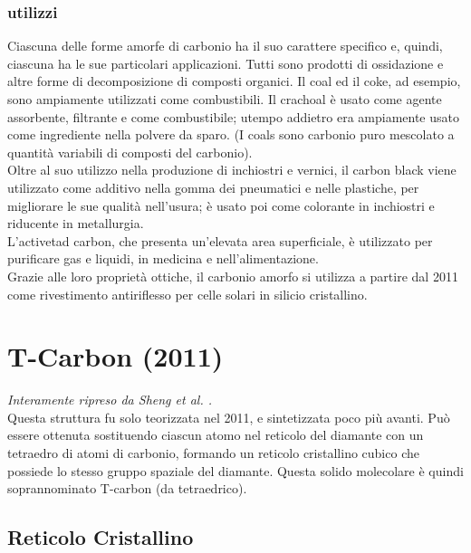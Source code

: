 \documentclass[a4paper,titlepage]{book}
\begin{document}
\subsection{utilizzi}
Ciascuna delle forme amorfe di carbonio ha il suo carattere specifico e, quindi, ciascuna ha le sue particolari applicazioni. Tutti sono prodotti di ossidazione e altre forme di decomposizione di composti organici. Il coal ed il coke, ad esempio, sono ampiamente utilizzati come combustibili. Il crachoal è usato come agente assorbente, filtrante e come combustibile; utempo addietro era ampiamente usato come ingrediente nella polvere da sparo. (I coals sono carbonio puro mescolato a quantità variabili di composti del carbonio). \\
Oltre al suo utilizzo nella produzione di inchiostri e vernici, il carbon black viene utilizzato come additivo nella gomma dei pneumatici e nelle plastiche, per migliorare le sue qualità nell'usura; è usato poi come colorante in inchiostri e riducente in metallurgia. \\
L'activetad carbon, che presenta un’elevata area superficiale, è utilizzato per purificare gas e liquidi, in medicina e nell’alimentazione. \\
Grazie alle loro proprietà ottiche, il carbonio amorfo si utilizza a partire dal 2011 come rivestimento antiriflesso per celle solari in silicio cristallino.
\chapter{T-Carbon (2011)}

\textit{Interamente ripreso da Sheng et al. \cite{TCAR}.}\\

Questa struttura fu solo teorizzata nel 2011, e sintetizzata poco più avanti. Può essere ottenuta sostituendo ciascun atomo nel reticolo del diamante con un tetraedro di atomi di carbonio, formando un reticolo cristallino cubico che possiede lo stesso gruppo spaziale del diamante. Questa solido molecolare è quindi soprannominato T-carbon (da tetraedrico).

\section{Reticolo Cristallino}
\end{document}
